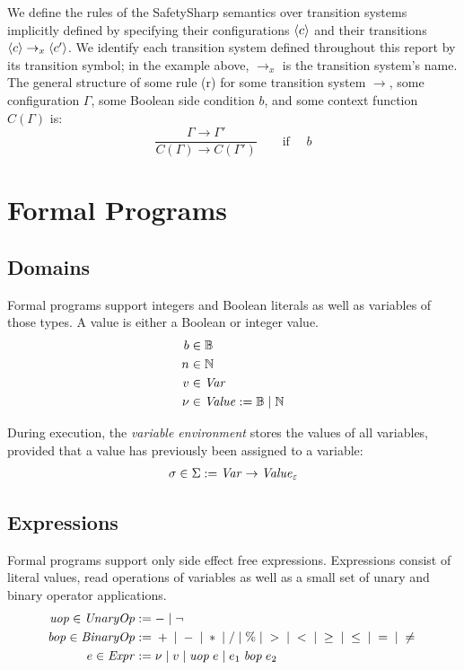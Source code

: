 \documentclass{article}
\begin{document}
	We define the rules of the SafetySharp semantics over transition systems implicitly defined by
	specifying their configurations $\langle c \rangle$ and their transitions $\langle c \rangle \rightarrow_x \langle c' \rangle$.
	We identify each transition system defined throughout this report by its transition symbol; in the example above, $\rightarrow_x$
	is the transition system's name.
	The general structure of some rule (r) for some transition system $\rightarrow$, 
	some configuration $\Gamma$, some Boolean side condition $b$,
	and some context function $C(\Gamma)$ is:
	\begin{equation*}
		\tag{r}
		\dfrac
		{
			\Gamma \rightarrow \Gamma'
		}
		{
			C(\Gamma) \rightarrow C(\Gamma')
		}
		\qquad \text{if } \quad b
	\end{equation*}

\section{Formal Programs}

\subsection{Domains}

Formal programs support integers and Boolean literals as well as variables of those types. A value is either a Boolean or integer
value.
\begin{align*}
    b &\in \mathbb{B}
    \\
    n &\in \mathbb{N}
    \\
    v &\in \mathit{Var}
    \\
    \nu &\in \mathit{Value}:= \mathbb{B} \mid \mathbb{N}
\end{align*}

During execution, the \textit{variable environment} stores the values of all variables, provided that a value has previously been
assigned to a variable:
\begin{align*}
	\sigma \in \Sigma := \mathit{Var} \rightarrow \mathit{Value}_\varepsilon
\end{align*}

\subsection{Expressions}

Formal programs support only side effect free expressions. Expressions consist of literal values, read operations of variables as
well as a small set of unary and binary operator applications.
\begin{align*}
	\mathit{uop} \in \mathit{UnaryOp} & := - \mid \neg
	\\
    \mathit{bop} \in \mathit{BinaryOp} & := {} + {} \mid {} - {} \mid {} \ast {} \mid {} / {}
                       \mid {} \% {} \mid {} > {} \mid {} < {} \mid {} \geq {} 
                       \mid {} \leq {} \mid {} = {} \mid {} \neq {}
	\\
	e \in \mathit{Expr} & := 
		\nu \mid v \mid
		\mathit{uop}\; e \mid
		e_1 \;\mathit{bop}\; e_2
\end{align*}
\end{document}
